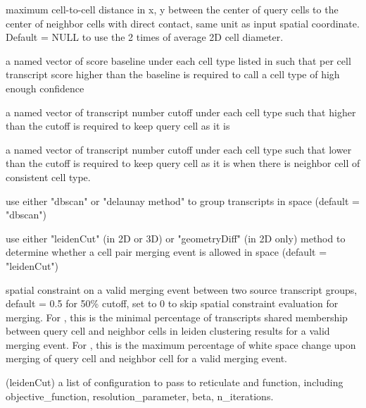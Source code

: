 \documentclass[letterpaper]{book}
\begin{document}
\begin{Arguments}
\begin{ldescription}
\item[\code{cellular\_distance\_cutoff}] maximum cell-to-cell distance in x, y between the center of query cells to the center of neighbor cells with direct contact, same unit as input spatial coordinate. Default = NULL to use the 2 times of average 2D cell diameter.

\item[\code{score\_baseline}] a named vector of score baseline under each cell type listed in  such that per cell transcript score higher than the baseline is required to call a cell type of high enough confidence

\item[\code{lowerCutoff\_transNum}] a named vector of transcript number cutoff under each cell type such that higher than the cutoff is required to keep query cell as it is

\item[\code{higherCutoff\_transNum}] a named vector of transcript number cutoff under each cell type such that lower than the cutoff is required to keep query cell as it is when there is neighbor cell of consistent cell type.

\item[\code{groupTranscripts\_method}] use either "dbscan" or "delaunay method" to group transcripts in space (default = "dbscan")

\item[\code{spatialMergeCheck\_method}] use either "leidenCut" (in 2D or 3D) or "geometryDiff" (in 2D only) method to determine whether a cell pair merging event is allowed in space (default = "leidenCut")

\item[\code{cutoff\_spatialMerge}] spatial constraint on a valid merging event between two source transcript groups, default = 0.5 for 50\% cutoff, set to 0 to skip spatial constraint evaluation for merging.
For , this is the minimal percentage of transcripts shared membership between query cell and neighbor cells in leiden clustering results for a valid merging event.
For , this is the maximum percentage of white space change upon merging of query cell and neighbor cell for a valid merging event.

\item[\code{leiden\_config}] (leidenCut) a list of configuration to pass to reticulate and  function, including objective\_function, resolution\_parameter, beta, n\_iterations.


\end{ldescription}
\end{Arguments}
\end{document}

